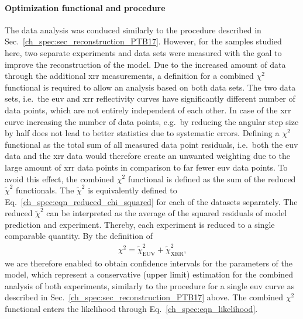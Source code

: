 \paragraph{Optimization functional and procedure} 
The data analysis was conduced similarly to the procedure described in Sec.~\ref{ch_spec:sec_reconstruction_PTB17}. However, for the samples studied here, two separate experiments and data sets were measured with the goal to improve the reconstruction of the model. Due to the increased amount of data through the additional \gls{xrr} measurements, a definition for a combined $\chi^2$ functional is required to allow an analysis based on both data sets. The two data sets, i.e.~the \gls{euv} and \gls{xrr} reflectivity curves have significantly different number of data points, which are not entirely independent of each other. In case of the \gls{xrr} curve increasing the number of data points, e.g.~by reducing the angular step size by half does not lead to better statistics due to systematic errors. Defining a $\chi^2$ functional as the total sum of all measured data point residuals, i.e.~both the \gls{euv} data and the \gls{xrr} data would therefore create an unwanted weighting due to the large amount of \gls{xrr} data points in comparison to far fewer \gls{euv} data points. To avoid this effect, the combined $\chi^2$ functional is defined as the sum of the reduced $\tilde{\chi}^2$ functionals. The $\tilde{\chi}^2$ is equivalently defined to Eq.~\eqref{ch_spec:eqn_reduced_chi_squared} for each of the datasets separately. The reduced $\tilde{\chi}^2$ can be interpreted as the average of the squared residuals of model prediction and experiment. Thereby, each experiment is reduced to a single comparable quantity. By the definition of
\begin{align}
\chi^2 = \tilde{\chi}^2_\text{EUV} +\tilde{\chi}^2_\text{XRR} \text{,}
\label{ch_spec:eqn_Mo_Si_C_total_chi_2}
\end{align}
we are therefore enabled to obtain confidence intervals for the parameters of the model, which represent a conservative (upper limit) estimation for the combined analysis of both experiments, similarly to the procedure for a single \gls{euv} curve as described in Sec.~\ref{ch_spec:sec_reconstruction_PTB17} above. The combined $\chi^2$ functional enters the likelihood through Eq.~\ref{ch_spec:eqn_likelihood}.

